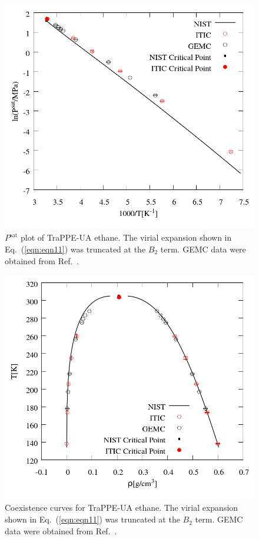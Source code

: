 \documentclass[%
 aip,
 jcp,
 sd,%
 amsmath,amssymb,
 reprint,%
]{revtex4-1}
\begin{document}
\begin{figure}
\includegraphics[scale=0.30]{Figures/EXAMPLE-SIM_TraPPE-C2_psat.png}
\caption{$P^{\mathrm{sat}}$ plot of TraPPE-UA ethane. The virial expansion shown in Eq.~(\ref{eqn:eqn11}) was truncated at the $B_2$ term. GEMC data were obtained from Ref.~.}
\label{fig:EXAMPLE-SIM/TraPPE-C2/Psat}
\end{figure}

\begin{figure}
\includegraphics[scale=0.30]{Figures/EXAMPLE-SIM_TraPPE-C2_trho.png}
\caption{Coexistence curves for TraPPE-UA ethane. The virial expansion shown in Eq.~(\ref{eqn:eqn11}) was truncated at the $B_2$ term. GEMC data were obtained from Ref.~.}
\label{fig:EXAMPLE-SIM/TraPPE-C2/T_rho}
\end{figure}
\end{document}
